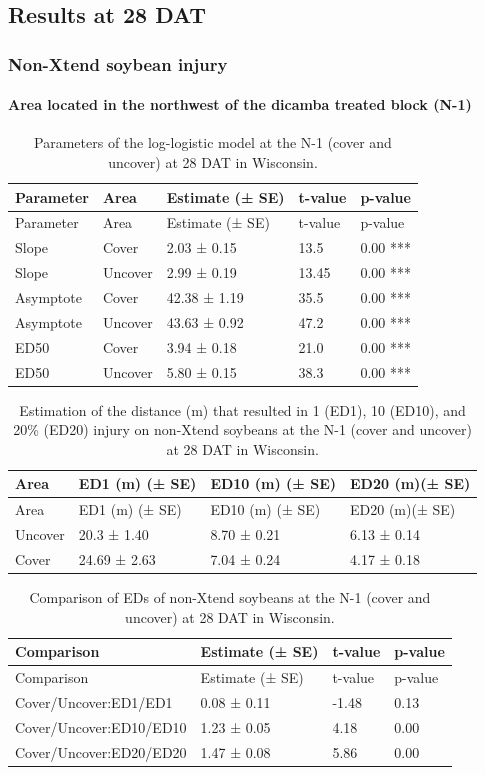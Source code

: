 \documentclass[]{article}
\let\oldparagraph\paragraph
\renewcommand{\paragraph}[1]{\oldparagraph{#1}\mbox{}}
\begin{document}
\pagebreak
\newpage

\subsection{Results at 28 DAT}\label{results-at-28-dat}

\subsubsection{Non-Xtend soybean
injury}\label{non-xtend-soybean-injury-1}

\paragraph{Area located in the northwest of the dicamba treated block
(N-1)}\label{area-located-in-the-northwest-of-the-dicamba-treated-block-n-1}

\begin{longtable}[]{@{}lllll@{}}
\caption{Parameters of the log-logistic model at the N-1 (cover and
uncover) at 28 DAT in Wisconsin.}\tabularnewline
\toprule
Parameter & Area & Estimate (± SE) & t-value & p-value\tabularnewline
\midrule
\endfirsthead
\toprule
Parameter & Area & Estimate (± SE) & t-value & p-value\tabularnewline
\midrule
\endhead
Slope & Cover & 2.03 ± 0.15 & 13.5 & 0.00 ***\tabularnewline
Slope & Uncover & 2.99 ± 0.19 & 13.45 & 0.00 ***\tabularnewline
Asymptote & Cover & 42.38 ± 1.19 & 35.5 & 0.00 ***\tabularnewline
Asymptote & Uncover & 43.63 ± 0.92 & 47.2 & 0.00 ***\tabularnewline
ED50 & Cover & 3.94 ± 0.18 & 21.0 & 0.00 ***\tabularnewline
ED50 & Uncover & 5.80 ± 0.15 & 38.3 & 0.00 ***\tabularnewline
\bottomrule
\end{longtable}

\begin{longtable}[]{@{}llll@{}}
\caption{Estimation of the distance (m) that resulted in 1 (ED1), 10
(ED10), and 20\% (ED20) injury on non-Xtend soybeans at the N-1 (cover
and uncover) at 28 DAT in Wisconsin.}\tabularnewline
\toprule
Area & ED1 (m) (± SE) & ED10 (m) (± SE) & ED20 (m)(± SE)\tabularnewline
\midrule
\endfirsthead
\toprule
Area & ED1 (m) (± SE) & ED10 (m) (± SE) & ED20 (m)(± SE)\tabularnewline
\midrule
\endhead
Uncover & 20.3 ± 1.40 & 8.70 ± 0.21 & 6.13 ± 0.14\tabularnewline
Cover & 24.69 ± 2.63 & 7.04 ± 0.24 & 4.17 ± 0.18\tabularnewline
\bottomrule
\end{longtable}

\begin{longtable}[]{@{}llll@{}}
\caption{Comparison of EDs of non-Xtend soybeans at the N-1 (cover and
uncover) at 28 DAT in Wisconsin.}\tabularnewline
\toprule
Comparison & Estimate (± SE) & t-value & p-value\tabularnewline
\midrule
\endfirsthead
\toprule
Comparison & Estimate (± SE) & t-value & p-value\tabularnewline
\midrule
\endhead
Cover/Uncover:ED1/ED1 & 0.08 ± 0.11 & -1.48 & 0.13\tabularnewline
Cover/Uncover:ED10/ED10 & 1.23 ± 0.05 & 4.18 & 0.00\tabularnewline
Cover/Uncover:ED20/ED20 & 1.47 ± 0.08 & 5.86 & 0.00\tabularnewline
\bottomrule
\end{longtable}
\end{document}

